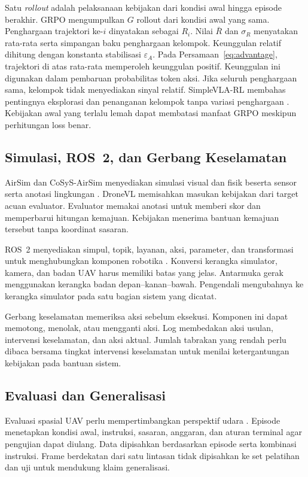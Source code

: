 Satu \textit{rollout} adalah pelaksanaan kebijakan dari kondisi awal hingga episode berakhir. GRPO mengumpulkan $G$ rollout dari kondisi awal yang sama. Penghargaan trajektori ke-$i$ dinyatakan sebagai $R_i$. Nilai $\bar R$ dan $\sigma_R$ menyatakan rata-rata serta simpangan baku penghargaan kelompok. Keunggulan relatif dihitung dengan konstanta stabilisasi $\varepsilon_A$.
Pada Persamaan~\ref{eq:advantage}, trajektori di atas rata-rata memperoleh keunggulan positif. Keunggulan ini digunakan dalam pembaruan probabilitas token aksi. Jika seluruh penghargaan sama, kelompok tidak menyediakan sinyal relatif. SimpleVLA-RL membahas pentingnya eksplorasi dan penanganan kelompok tanpa variasi penghargaan \citep{li2026simplevlarl}. Kebijakan awal yang terlalu lemah dapat membatasi manfaat GRPO meskipun perhitungan loss benar.

\subsection{Simulasi, ROS~2, dan Gerbang Keselamatan}
\label{subsec:cosys_ros}
AirSim dan CoSyS-AirSim menyediakan simulasi visual dan fisik beserta sensor serta anotasi lingkungan \citep{shah2017airsim,jansen2023cosysairsim}. DroneVL memisahkan masukan kebijakan dari target acuan evaluator. Evaluator memakai anotasi untuk memberi skor dan memperbarui hitungan kemajuan. Kebijakan menerima bantuan kemajuan tersebut tanpa koordinat sasaran. %

ROS~2 menyediakan simpul, topik, layanan, aksi, parameter, dan transformasi untuk menghubungkan komponen robotika \citep{macenski2022ros2}. Konversi kerangka simulator, kamera, dan badan UAV harus memiliki batas yang jelas. Antarmuka gerak menggunakan kerangka badan depan--kanan--bawah. Pengendali mengubahnya ke kerangka simulator pada satu bagian sistem yang dicatat. %

Gerbang keselamatan memeriksa aksi sebelum eksekusi. Komponen ini dapat memotong, menolak, atau mengganti aksi. Log membedakan aksi usulan, intervensi keselamatan, dan aksi aktual. Jumlah tabrakan yang rendah perlu dibaca bersama tingkat intervensi keselamatan untuk menilai ketergantungan kebijakan pada bantuan sistem.

\subsection{Evaluasi dan Generalisasi}
\label{subsec:keselamatan_benchmark}
Evaluasi spasial UAV perlu mempertimbangkan perspektif udara \citep{zhang2025skyready}. Episode menetapkan kondisi awal, instruksi, sasaran, anggaran, dan aturan terminal agar pengujian dapat diulang. Data dipisahkan berdasarkan episode serta kombinasi instruksi. Frame berdekatan dari satu lintasan tidak dipisahkan ke set pelatihan dan uji untuk mendukung klaim generalisasi. %

